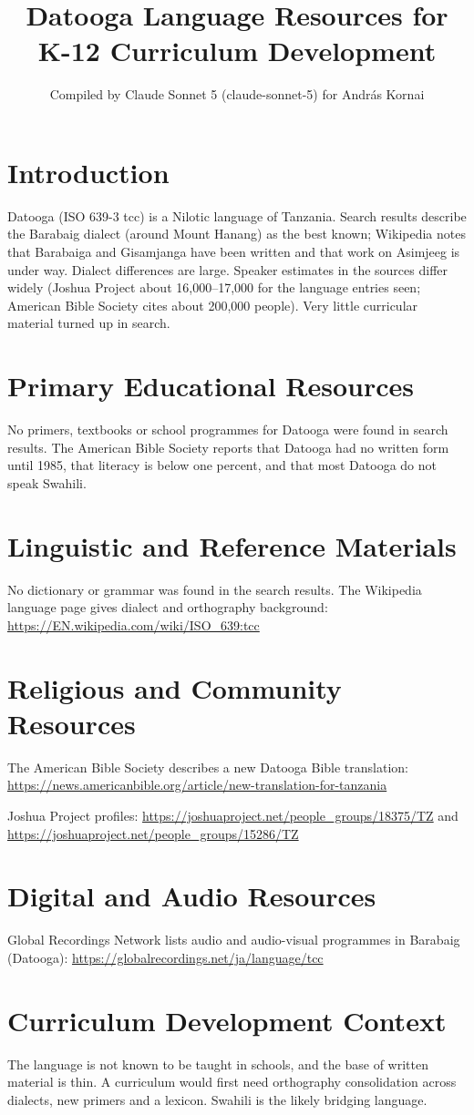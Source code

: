 \documentclass[12pt]{article}
\title{Datooga Language Resources for K-12 Curriculum Development}
\author{Compiled by Claude Sonnet 5 (claude-sonnet-5) for Andr\'as Kornai}
\date{}
\begin{document}
\maketitle
\section{Introduction}
Datooga (ISO 639-3 tcc) is a Nilotic language of Tanzania. Search results describe the Barabaig dialect (around Mount Hanang) as the best known; Wikipedia notes that Barabaiga and Gisamjanga have been written and that work on Asimjeeg is under way. Dialect differences are large. Speaker estimates in the sources differ widely (Joshua Project about 16,000--17,000 for the language entries seen; American Bible Society cites about 200,000 people). Very little curricular material turned up in search.
\section{Primary Educational Resources}
No primers, textbooks or school programmes for Datooga were found in search results. The American Bible Society reports that Datooga had no written form until 1985, that literacy is below one percent, and that most Datooga do not speak Swahili.
\section{Linguistic and Reference Materials}
No dictionary or grammar was found in the search results. The Wikipedia language page gives dialect and orthography background: \url{https://EN.wikipedia.com/wiki/ISO_639:tcc}
\section{Religious and Community Resources}
The American Bible Society describes a new Datooga Bible translation: \url{https://news.americanbible.org/article/new-translation-for-tanzania}

Joshua Project profiles: \url{https://joshuaproject.net/people_groups/18375/TZ} and \url{https://joshuaproject.net/people_groups/15286/TZ}
\section{Digital and Audio Resources}
Global Recordings Network lists audio and audio-visual programmes in Barabaig (Datooga): \url{https://globalrecordings.net/ja/language/tcc}
\section{Curriculum Development Context}
The language is not known to be taught in schools, and the base of written material is thin. A curriculum would first need orthography consolidation across dialects, new primers and a lexicon. Swahili is the likely bridging language.
\end{document}
